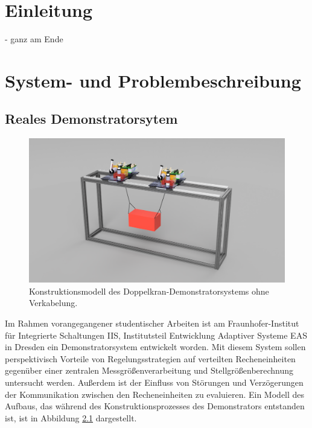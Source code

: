\pagestyle{scrheadings}

\chapter{Einleitung}
- ganz am Ende

\chapter{System- und Problembeschreibung}

\section{Reales Demonstratorsytem}

\begin{figure}[ht]
	\begin{center}
		\includegraphics[scale=0.5]{Pictures/Veritas_demo_CAD.png}
	\end{center}
	\caption[Konstruktionsmodell des Doppelkransystems]
	{Konstruktionsmodell des Doppelkran-Demonstratorsystems ohne Verkabelung.}
	\label{fig:demonstrator_CAD}
\end{figure}

Im Rahmen vorangegangener studentischer Arbeiten ist am Fraunhofer-Institut für Integrierte Schaltungen IIS, Institutsteil Entwicklung Adaptiver Systeme EAS \cite{fraunhoferIISEAS} in Dresden ein Demonstratorsystem entwickelt worden. Mit diesem System sollen perspektivisch Vorteile von Regelungsstrategien auf verteilten Recheneinheiten gegenüber einer zentralen Messgrößenverarbeitung und Stellgrößenberechnung untersucht werden. Außerdem ist der Einfluss von Störungen und Verzögerungen der Kommunikation zwischen den Recheneinheiten zu evaluieren. Ein Modell des Aufbaus, das während des Konstruktionsprozesses des Demonstrators entstanden ist, ist in Abbildung \ref{fig:demonstrator_CAD} dargestellt.

